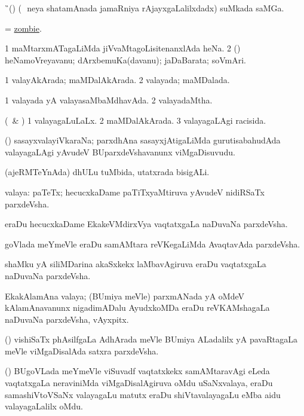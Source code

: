 \bentry 
{} 
\gl{\nA} 
\bmng
\G\
(\ca) (\kanmu\ \,neya shatamAnada jamaRniya rAjayxgaLalilxdadx) suMkada saMGa.
\emng
\eentry

\bentry
{} 
\gl{\nA} 
\bmng
= \hyperlink{zombie}{zombie}.
\emng 
\eentry

\bentry
{} 
\gl{\nA} 
\bmng
\bnum
\num{1} maMtarxmATagaLiMda jiVvaMtagoLisitenanxlAda heNa. 
\num{2} (\AmA) heNamoVreyavanu;  dArxbemuKa(davanu); jaDaBarata; soVmAri.
\enum
\emng
\eentry
 
\bentry
{} 
\gl{\gu} 
\bmng
\bnum
\num{1} valayAkArada; maMDalAkArada. 
\num{2} valayada; maMDalada.
\enum
\emng
\eentry

\bentry
{} 
\gl{\gu} 
\bmng
\bnum
\num{1} valayada yA valayasaMbaMdhavAda. 
\num{2} valayadaMtha.
\enum
\emng
\eentry

\bentry
{} 
\gl{\gu}
\bmng
(\savi\ \& \pArxvi) 
\bnum
\num{1} valayagaLuLaLx. 
\num{2} maMDalAkArada. 
\num{3} valayagaLAgi racisida.
\enum
\emng
\eentry

\bentry
{}  
\gl{\nA}  
\bmng
(\savi) sasayxvalayiVkaraNa; parxdhAna sasayxjAtigaLiMda gurutisabahudAda valayagaLAgi yAvudeV BUparxdeVshavanunx viMgaDisuvudu.
\emng
\eentry

\bentry
{} 
\gl{\nA} 
\bmng
(ajeRMTeYnAda) dhULu tuMbida, utatxrada bisigALi. 
\emng
\eentry

\bentry
{} 
\gl{\nA}
\bmng
\bnum
{} valaya: 
\banum
{} paTeTx; hecucxkaDame paTiTxyaMtiruva yAvudeV nidiRSaTx parxdeVsha.  

 eraDu hecucxkaDame EkakeVMdirxVya vaqtatxgaLa naDuvaNa parxdeVsha. 

 goVlada meYmeVle eraDu samAMtara reVKegaLiMda AvaqtavAda parxdeVsha. 

 shaMku yA siliMDarina akaSxkekx laMbavAgiruva eraDu vaqtatxgaLa naDuvaNa parxdeVsha.  

\hypertarget{zone(1)1e}{}
 EkakAlamAna valaya; (BUmiya meVle) parxmANada yA oMdeV kAlamAnavanunx nigadimADalu AyudxkoMDa eraDu reVKAMshagaLa naDuvaNa parxdeVsha, vAyxpitx.  

 (\BUvi) vishiSaTx phAsilfgaLa AdhArada meVle BUmiya ALadalilx yA pavaRtagaLa meVle viMgaDisalAda satxra parxdeVsha.

 (\BUgoV) BUgoVLada meYmeVle viSuvadf vaqtatxkekx samAMtaravAgi eLeda  vaqtatxgaLa neraviniMda viMgaDisalAgiruva oMdu uSaNxvalaya, eraDu samashiVtoVSaNx valayagaLu matutx eraDu shiVtavalayagaLu eMba aidu valayagaLalilx oMdu.   

